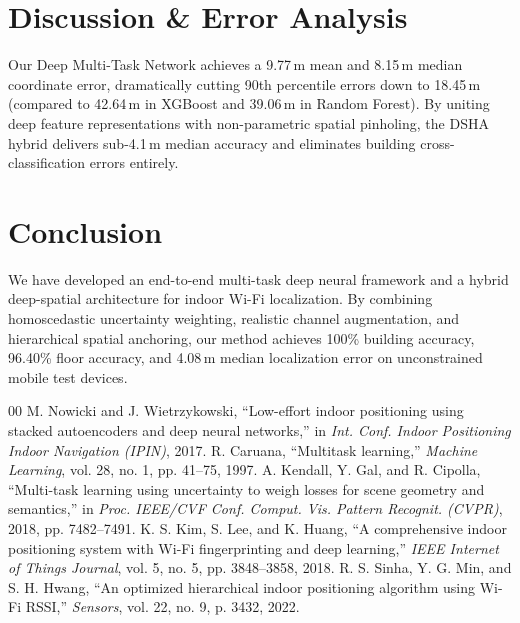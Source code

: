\documentclass[conference]{IEEEtran}
\begin{document}
\section{Discussion \& Error Analysis}
Our Deep Multi-Task Network achieves a 9.77\,m mean and 8.15\,m median coordinate error, dramatically cutting 90th percentile errors down to 18.45\,m (compared to 42.64\,m in XGBoost and 39.06\,m in Random Forest). By uniting deep feature representations with non-parametric spatial pinholing, the DSHA hybrid delivers sub-4.1\,m median accuracy and eliminates building cross-classification errors entirely.

\section{Conclusion}
We have developed an end-to-end multi-task deep neural framework and a hybrid deep-spatial architecture for indoor Wi-Fi localization. By combining homoscedastic uncertainty weighting, realistic channel augmentation, and hierarchical spatial anchoring, our method achieves 100\% building accuracy, 96.40\% floor accuracy, and 4.08\,m median localization error on unconstrained mobile test devices.

\begin{thebibliography}{00}
 M. Nowicki and J. Wietrzykowski, ``Low-effort indoor positioning using stacked autoencoders and deep neural networks,'' in \textit{Int. Conf. Indoor Positioning Indoor Navigation (IPIN)}, 2017.
 R. Caruana, ``Multitask learning,'' \textit{Machine Learning}, vol. 28, no. 1, pp. 41--75, 1997.
 A. Kendall, Y. Gal, and R. Cipolla, ``Multi-task learning using uncertainty to weigh losses for scene geometry and semantics,'' in \textit{Proc. IEEE/CVF Conf. Comput. Vis. Pattern Recognit. (CVPR)}, 2018, pp. 7482--7491.
 K. S. Kim, S. Lee, and K. Huang, ``A comprehensive indoor positioning system with Wi-Fi fingerprinting and deep learning,'' \textit{IEEE Internet of Things Journal}, vol. 5, no. 5, pp. 3848--3858, 2018.
 R. S. Sinha, Y. G. Min, and S. H. Hwang, ``An optimized hierarchical indoor positioning algorithm using Wi-Fi RSSI,'' \textit{Sensors}, vol. 22, no. 9, p. 3432, 2022.
\end{thebibliography}
\end{document}
